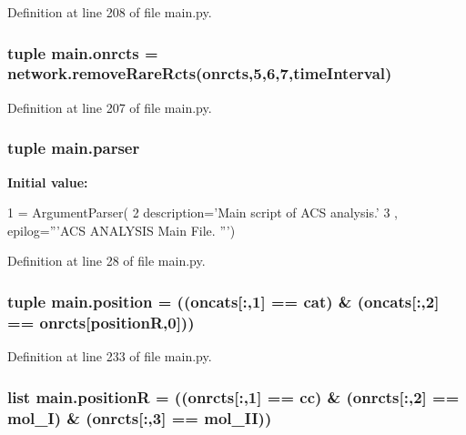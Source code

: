 Definition at line 208 of file main.\-py.

\hypertarget{a00111_ab26ffc3eda5d201a779d705813b06348}{
\subsubsection[{onrcts}]{\setlength{\rightskip}{0pt plus 5cm}tuple main.\-onrcts = network.\-remove\-Rare\-Rcts(onrcts,5,6,7,{\bf time\-Interval})}}\label{a00111_ab26ffc3eda5d201a779d705813b06348}


Definition at line 207 of file main.\-py.

\hypertarget{a00111_a6596d20927a9196bbb33aef704e88297}{
\subsubsection[{parser}]{\setlength{\rightskip}{0pt plus 5cm}tuple main.\-parser}}\label{a00111_a6596d20927a9196bbb33aef704e88297}
{\bfseries Initial value\-:}
\begin{DoxyCode}
1 = ArgumentParser(
2                                 description=\textcolor{stringliteral}{'Main script of ACS analysis.'}
3                                 , epilog=\textcolor{stringliteral}{'''ACS ANALYSIS Main File. '''})
\end{DoxyCode}


Definition at line 28 of file main.\-py.

\hypertarget{a00111_ac67c60df3cc9afae7e4888d2b48b846d}{
\subsubsection[{position}]{\setlength{\rightskip}{0pt plus 5cm}tuple main.\-position = (({\bf oncats}\mbox{[}\-:,1\mbox{]} == {\bf cat}) \& ({\bf oncats}\mbox{[}\-:,2\mbox{]} == {\bf onrcts}\mbox{[}{\bf position\-R},0\mbox{]}))}}\label{a00111_ac67c60df3cc9afae7e4888d2b48b846d}


Definition at line 233 of file main.\-py.

\hypertarget{a00111_adbbdc0f6ad0f08400b3e492f7a807a6b}{
\subsubsection[{position\-R}]{\setlength{\rightskip}{0pt plus 5cm}list main.\-position\-R = (({\bf onrcts}\mbox{[}\-:,1\mbox{]} == {\bf cc}) \& ({\bf onrcts}\mbox{[}\-:,2\mbox{]} == {\bf mol\-\_\-\-I}) \& ({\bf onrcts}\mbox{[}\-:,3\mbox{]} == {\bf mol\-\_\-\-I\-I}))}}\label{a00111_adbbdc0f6ad0f08400b3e492f7a807a6b}


